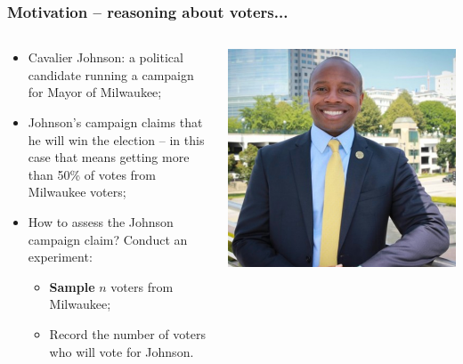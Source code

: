 \documentclass[aspectratio=169]{beamer}
\theoremstyle{principle}
\begin{document}
\begin{frame}
\frametitle{Motivation -- reasoning about voters...}

\begin{columns}
\begin{column}{0.5\textwidth}

\begin{itemize}
\item Cavalier Johnson: a political candidate running a campaign for Mayor of Milwaukee;
\bigskip

\item Johnson's campaign claims that he will win the election -- in this case that means getting more than 50\% of votes from Milwaukee voters;
\bigskip

\item How to assess the Johnson campaign claim?  Conduct an experiment:
\begin{itemize}
\item \textbf{Sample} $n$ voters from Milwaukee;
\item Record the number of voters who will vote for Johnson.
\end{itemize}

\end{itemize}

\end{column}
\begin{column}{0.5\textwidth}
\begin{center}
\includegraphics[scale=0.4]{Johnson.png}
\end{center}
\end{column}
\end{columns}

\end{frame}
\end{document}
